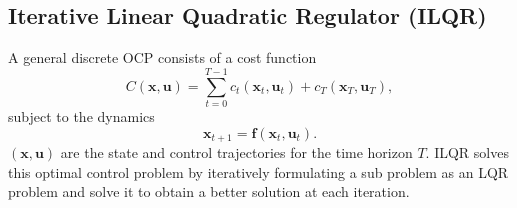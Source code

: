\subsection{Iterative Linear Quadratic Regulator (ILQR)}
\label{sec:ilqr}

A general discrete OCP consists of a cost function
\begin{equation}
C(\bm{x}, \bm{u}) = \sum_{t=0}^{T-1} c_t(\bm{x}_t, \bm{u}_t) + c_T(\bm{x}_T, \bm{u}_T),
\label{eq:general_cost}
\end{equation}
subject to the dynamics
\begin{equation}
\bm{x}_{t+1} = \bm{f}(\bm{x}_t, \bm{u}_t).
\label{eq:general_dynamics}
\end{equation}
$(\bm{x}, \bm{u})$ are the state and control trajectories for the time horizon $T$. ILQR solves this optimal control problem by iteratively formulating a sub problem as an LQR problem and solve it to obtain a better solution at each iteration.

